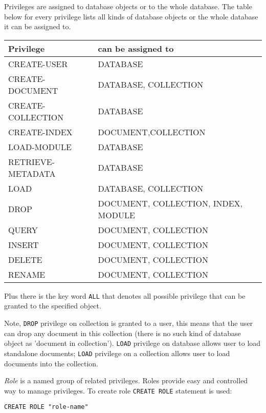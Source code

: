 \documentclass[a4paper,12pt]{article}
\begin{document}
Privileges are assigned to database objects or to the whole database. The table below for every privilege lists all kinds of database objects or the whole database it can be assigned to.

\begin{tabular}{|l|l|}
\hline
\hline
Privilege            & can be assigned to             \\
\hline
\hline
CREATE-USER          & DATABASE                       \\
\hline
CREATE-DOCUMENT      & DATABASE, COLLECTION           \\
\hline
CREATE-COLLECTION    & DATABASE                       \\
\hline
CREATE-INDEX         & DOCUMENT,COLLECTION            \\
\hline
LOAD-MODULE          & DATABASE                       \\
\hline
RETRIEVE-METADATA    & DATABASE                       \\
\hline
LOAD                 & DATABASE, COLLECTION           \\
\hline
DROP                 & DOCUMENT, COLLECTION, INDEX, MODULE    \\
\hline
QUERY                & DOCUMENT, COLLECTION           \\
\hline
INSERT               & DOCUMENT, COLLECTION           \\
\hline
DELETE               & DOCUMENT, COLLECTION           \\
\hline
RENAME               & DOCUMENT, COLLECTION           \\
\hline
\end{tabular}

Plus there is the key word \verb!ALL! that denotes all possible privilege that can be granted to the specified object.

Note, \verb!DROP! privilege on collection is granted to a user, this means that the user can drop any document in this collection (there is no such kind of database object as 'document in collection'). \verb!LOAD! privilege on database allows user to load standalone documents; \verb!LOAD! privilege on a collection allows user to load documents into the collection.

\emph{Role} is a named group of related privileges. Roles provide easy and controlled way to manage privileges. To create role \verb!CREATE ROLE! statement is used:

\begin{verbatim}
CREATE ROLE "role-name"
\end{verbatim}
\end{document}
